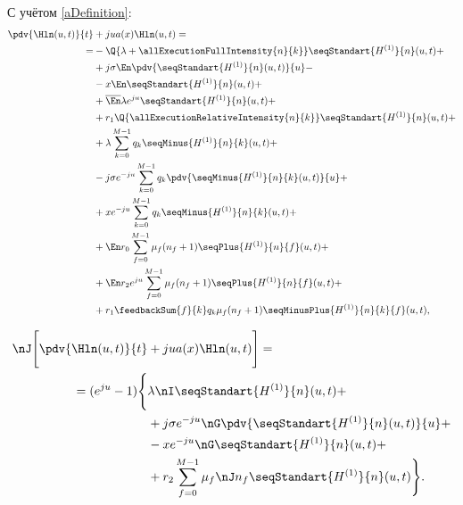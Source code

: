 С учётом \eqref{aDefinition}:
\begin{equation*}\begin{aligned}
\pdv{\Hln(u,t)}{t} &+ jua(x) \Hln (u,t)= \\
   =&-\Q{\lambda+\allExecutionFullIntensity{n}{k}}\seqStandart{H^{(1)}}{n}(u,t)+\\
    &+j \sigma \En \pdv{\seqStandart{H^{(1)}}{n}(u,t)}{u} - \\ 
    &-x \En \seqStandart{H^{(1)}}{n}(u,t) + \\
    &+\overline{\En} \lambda e^{ju} \seqStandart{H^{(1)}}{n}(u,t)+\\
    &+r_1 \Q{\allExecutionRelativeIntensity{n}{k}} \seqStandart{H^{(1)}}{n}(u,t) + \\
    &+\lambda\sum_{k=0}^{M-1}q_k \seqMinus{H^{(1)}}{n}{k}(u,t) + \\
    &-j \sigma  e^{-ju} \sum_{k=0}^{M-1}q_k \pdv{\seqMinus{H^{(1)}}{n}{k}(u,t)}{u} + \\
    &+x  e^{-ju} \sum_{k=0}^{M-1}q_k \seqMinus{H^{(1)}}{n}{k}(u,t) + \\
    &+\En r_0 \sum_{f=0}^{M-1} \mu_f (n_f + 1) \seqPlus{H^{(1)}}{n}{f}(u,t) + \\
    &+\En r_2 e^{ju} \sum_{f=0}^{M-1} \mu_f (n_f + 1) \seqPlus{H^{(1)}}{n}{f}(u,t) + \\
    &+r_1 \feedbackSum{f}{k}
        q_k \mu_f (n_f+1) \seqMinusPlus{H^{(1)}}{n}{k}{f}(u,t),
\end{aligned}\end{equation*}

\begin{equation*}\begin{aligned} 
\nJ \Bigg[ \pdv{\Hln(u,t)}{t} & + jua(x) \Hln (u,t) \Bigg] = \\
=(e^{ju} - 1)
\Bigg\{
    &\lambda \nI \seqStandart{H^{(1)}}{n}(u,t)+\\
    &+j\sigma e^{-ju} \nG\pdv{\seqStandart{H^{(1)}}{n}(u,t)}{u} + \\
    &-x e^{-ju} \nG \seqStandart{H^{(1)}}{n}(u,t) + \\
    &+r_2\sum_{f=0}^{M-1} \mu_f \nJ n_f \seqStandart{H^{(1)}}{n}(u,t)
\Bigg\}
.
\end{aligned}\end{equation*}



